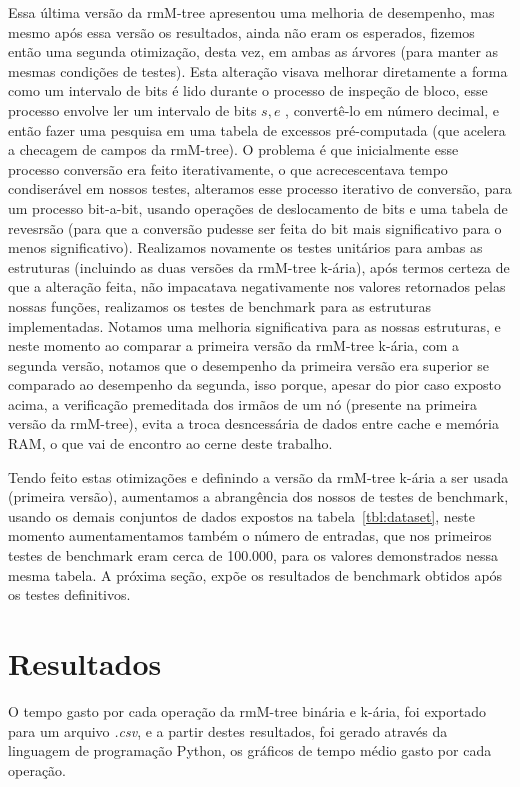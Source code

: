 Essa última versão da rmM-tree apresentou uma melhoria de desempenho, mas mesmo após essa versão os resultados, 
ainda não eram os esperados, fizemos então uma segunda otimização, desta vez, em ambas as árvores (para manter as mesmas condições de testes). 
Esta alteração visava melhorar diretamente a forma como um intervalo de bits é lido durante o processo de inspeção de bloco, esse processo envolve ler um intervalo de bits $s,e$ , convertê-lo em número decimal,
e então fazer uma pesquisa em uma tabela de excessos pré-computada (que acelera a checagem de campos da rmM-tree).
O problema é que inicialmente esse processo conversão era feito iterativamente,  o que acrecescentava tempo condiserável em nossos testes, 
alteramos esse processo iterativo de conversão, para um processo bit-a-bit, usando operações de deslocamento de bits e uma tabela de revesrsão  
(para que a conversão pudesse ser feita do bit mais significativo para o menos significativo).
Realizamos novamente os testes unitários para ambas as estruturas (incluindo as duas versões da rmM-tree k-ária), após termos certeza de que a alteração feita, não impacatava negativamente nos valores retornados pelas nossas funções,
realizamos os testes de benchmark para as estruturas implementadas. Notamos uma melhoria significativa para as nossas estruturas, e neste momento ao comparar a primeira 
versão da rmM-tree k-ária, com a segunda versão, notamos que o desempenho da primeira versão era superior se comparado ao desempenho da segunda, isso porque, apesar do pior caso exposto acima, a verificação premeditada dos irmãos de um nó (presente na primeira 
versão da rmM-tree), evita a troca desncessária de dados entre cache e memória RAM, o que vai de encontro ao cerne deste trabalho.

Tendo feito estas otimizações e definindo a versão da rmM-tree k-ária  a ser usada (primeira versão), aumentamos a abrangência dos nossos de testes de benchmark,
usando os demais conjuntos de dados expostos  na tabela~\ref{tbl:dataset}, neste momento aumentamentamos também o número de entradas, 
que nos primeiros testes de benchmark eram cerca de 100.000, para os valores demonstrados nessa mesma tabela.
A próxima seção, expõe os resultados de benchmark obtidos após os testes definitivos.

\section{Resultados}\label{sec:resultados}
O tempo gasto por cada operação da rmM-tree binária e k-ária, foi exportado para um arquivo \textit{.csv}, e a partir destes resultados,
foi gerado através da linguagem de programação Python, os gráficos de tempo médio gasto por cada operação. 

